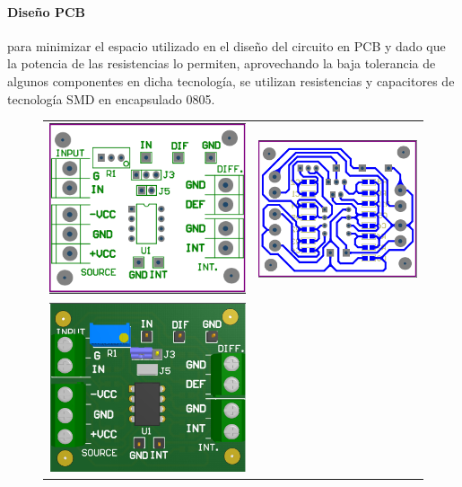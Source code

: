 \paragraph*{Dise\~no PCB} para minimizar el espacio utilizado en el dise\~no del circuito en PCB y dado que la potencia de las resistencias lo permiten, aprovechando la baja tolerancia de algunos
componentes en dicha tecnolog\'ia, se utilizan resistencias y capacitores de tecnolog\'ia SMD en encapsulado 0805.

\begin{figure}[H]
	\centering
	\begin{tabular}{c c}
		\includegraphics[scale=0.6]{Recursos/Altium/Placa_OVERLAY.png} &
		\includegraphics[scale=0.6]{Recursos/Altium/Placa_PCB.png} \\
		\includegraphics[scale=0.6]{Recursos/Altium/Placa_3D_OVERLAY.png} &

\end{tabular}
\end{figure}

